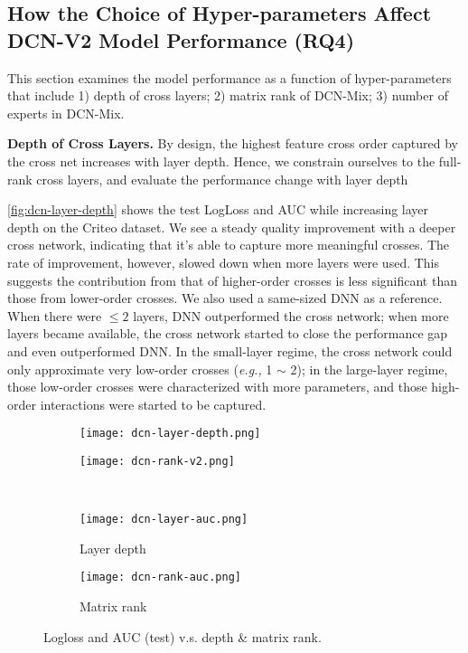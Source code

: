 \documentclass[sigconf]{acmart}
\begin{document}
\subsection{How the Choice of Hyper-parameters Affect {DCN-V2} Model Performance (RQ4)} 
\label{sec:hyper-parameters}
This section examines the model performance as a function of hyper-parameters that include 1) depth of cross layers; 2) matrix rank of {DCN-Mix}; 3) number of experts in {DCN-Mix}.

{\bf Depth of Cross Layers.}
By design, the highest feature cross order captured by the cross net increases with layer depth. Hence, we constrain ourselves to the full-rank cross layers, and evaluate the performance change with layer depth

\autoref{fig:dcn-layer-depth} shows the test LogLoss and AUC while increasing layer depth on the Criteo dataset. We see a steady quality improvement with a deeper cross network, indicating that it's able to capture more meaningful crosses. The rate of improvement, however, slowed down when more layers were used. This suggests the contribution from that of higher-order crosses is less significant than those from lower-order crosses. We also used a same-sized DNN as a reference. When there were $\le 2$ layers, DNN outperformed the cross network; when more layers became available, the cross network started to close the performance gap and even outperformed DNN. In the small-layer regime, the cross network could only approximate very low-order crosses (\emph{e.g.,} 1 $\sim$ 2); in the large-layer regime, those low-order crosses were characterized with more parameters, and those high-order interactions were started to be captured.

\begin{figure}[htbp]
\small
\centering
    \begin{subfigure}[b]{0.22\textwidth}  
    \texttt{[image: dcn-layer-depth.png]}
    \end{subfigure}
    \hfill
    \begin{subfigure}[b]{0.22\textwidth}  
    \texttt{[image: dcn-rank-v2.png]}
    \end{subfigure}\\[-2ex]
    \begin{subfigure}[b]{0.22\textwidth}  
    \texttt{[image: dcn-layer-auc.png]}
    \caption{Layer depth}
    \label{fig:dcn-layer-depth}
    \end{subfigure}
    \hfill
    \begin{subfigure}[b]{0.22\textwidth}  
    \texttt{[image: dcn-rank-auc.png]}
    \caption{Matrix rank}
    \label{fig:dcn-rank}
    \end{subfigure}
    \vspace{-2ex}
    \caption{Logloss and AUC (test) v.s. depth \& matrix rank.}
\vspace{-10pt}
\end{figure}
\end{document}

